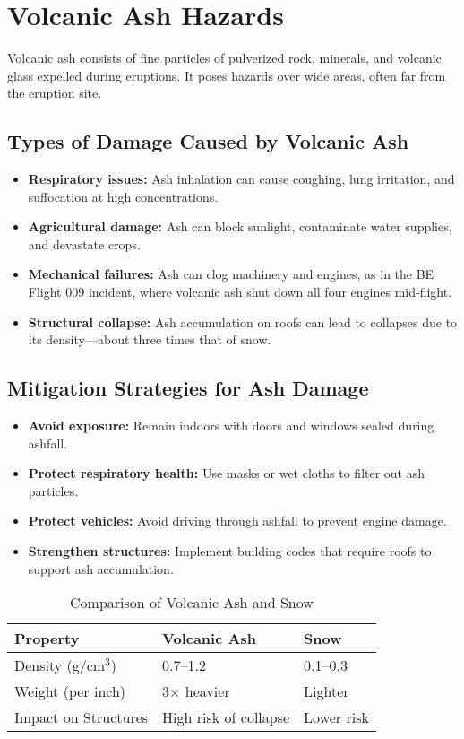 \documentclass{article}
\begin{document}
\section{Volcanic Ash Hazards}
Volcanic ash consists of fine particles of pulverized rock, minerals, and volcanic glass expelled during eruptions. It poses hazards over wide areas, often far from the eruption site.

\subsection{Types of Damage Caused by Volcanic Ash}
\begin{itemize}
    \item \textbf{Respiratory issues:} Ash inhalation can cause coughing, lung irritation, and suffocation at high concentrations.
    \item \textbf{Agricultural damage:} Ash can block sunlight, contaminate water supplies, and devastate crops.
    \item \textbf{Mechanical failures:} Ash can clog machinery and engines, as in the BE Flight 009 incident, where volcanic ash shut down all four engines mid-flight.
    \item \textbf{Structural collapse:} Ash accumulation on roofs can lead to collapses due to its density—about three times that of snow.
\end{itemize}

\subsection{Mitigation Strategies for Ash Damage}
\begin{itemize}
    \item \textbf{Avoid exposure:} Remain indoors with doors and windows sealed during ashfall.
    \item \textbf{Protect respiratory health:} Use masks or wet cloths to filter out ash particles.
    \item \textbf{Protect vehicles:} Avoid driving through ashfall to prevent engine damage.
    \item \textbf{Strengthen structures:} Implement building codes that require roofs to support ash accumulation.
\end{itemize}

\begin{table}[h]
\centering
\caption{Comparison of Volcanic Ash and Snow}
\begin{tabular}{@{}lll@{}}
\toprule
\textbf{Property}      & \textbf{Volcanic Ash} & \textbf{Snow} \\ \midrule
Density (g/cm$^3$)     & 0.7--1.2              & 0.1--0.3     \\
Weight (per inch)      & 3$\times$ heavier     & Lighter       \\
Impact on Structures   & High risk of collapse & Lower risk    \\ \bottomrule
\end{tabular}
\end{table}
\end{document}
